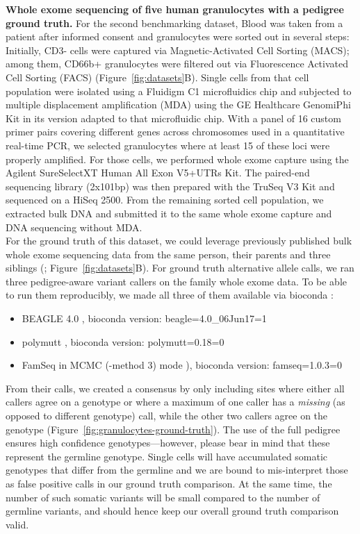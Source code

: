 \documentclass[authoryear,preprint,11pt]{scrartcl}
\begin{document}
\textbf{Whole exome sequencing of five human granulocytes with a pedigree ground truth.}
For the second benchmarking dataset, Blood was taken from a patient after informed consent and granulocytes were sorted out in several steps: Initially, CD3- cells were captured via Magnetic-Activated Cell Sorting (MACS); among them, CD66b+ granulocytes were filtered out via Fluorescence Activated Cell Sorting (FACS) (Figure~\ref{fig:datasets}B).
Single cells from that cell population were isolated using a Fluidigm C1 microfluidics chip and subjected to multiple displacement amplification (MDA) using the GE Healthcare GenomiPhi Kit in its version adapted to that microfluidic chip.
With a panel of 16 custom primer pairs covering different genes across chromosomes used in a quantitative real-time PCR, we selected granulocytes where at least 15 of these loci were properly amplified.
For those cells, we performed whole exome capture using the Agilent SureSelectXT Human All Exon V5+UTRs Kit.
The paired-end sequencing library (2x101bp) was then prepared with the TruSeq V3 Kit and sequenced on a HiSeq 2500.
From the remaining sorted cell population, we extracted bulk DNA and submitted it to the same whole exome capture and DNA sequencing without MDA.\\

For the ground truth of this dataset, we could leverage previously published bulk whole exome sequencing data from the same person, their parents and three siblings (\cite{hoell_constitutional_2014}; Figure~\ref{fig:datasets}B).
For ground truth alternative allele calls, we ran three pedigree-aware variant callers on the family whole exome data.
To be able to run them reproducibly, we made all three of them available via bioconda \citep{gruning_bioconda:_2018}:
\begin{itemize}
  \item BEAGLE 4.0 \citep{browning_improving_2013}, bioconda version: {\ttfamily beagle=4.0\_06Jun17=1}
  \item polymutt \citep{li_likelihood-based_2012}, bioconda version: {\ttfamily polymutt=0.18=0}
  \item FamSeq in MCMC ({\ttfamily -method 3}) mode \citep{peng_rare_2013,peng_famseq:_2014}), bioconda version: {\ttfamily famseq=1.0.3=0}
\end{itemize}
From their calls, we created a consensus by only including sites where either all callers agree on a genotype or where a maximum of one caller has a \emph{missing} (as opposed to different genotype) call, while the other two callers agree on the genotype (Figure~\ref{fig:granulocytes-ground-truth}).
The use of the full pedigree ensures high confidence genotypes---however, please bear in mind that these represent the germline genotype.
Single cells will have accumulated somatic genotypes that differ from the germline and we are bound to mis-interpret those as false positive calls in our ground truth comparison.
At the same time, the number of such somatic variants will be small compared to the number of germline variants, and should hence keep our overall ground truth comparison valid.\\
\end{document}
